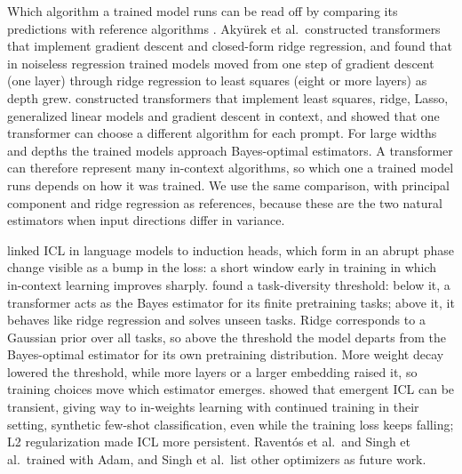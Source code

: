 \documentclass{article}
\begin{document}
Which algorithm a trained model runs can be read off by comparing its predictions with reference algorithms \citep{akyurek2023}. Akyürek et al.\ constructed transformers that implement gradient descent and closed-form ridge regression, and found that in noiseless regression trained models moved from one step of gradient descent (one layer) through ridge regression to least squares (eight or more layers) as depth grew. \citet{bai2023} constructed transformers that implement least squares, ridge, Lasso, generalized linear models and gradient descent in context, and showed that one transformer can choose a different algorithm for each prompt. For large widths and depths the trained models approach Bayes-optimal estimators. A transformer can therefore represent many in-context algorithms, so which one a trained model runs depends on how it was trained. We use the same comparison, with principal component and ridge regression as references, because these are the two natural estimators when input directions differ in variance.

\citet{olsson2022} linked ICL in language models to induction heads, which form in an abrupt phase change visible as a bump in the loss: a short window early in training in which in-context learning improves sharply. \citet{raventos2023} found a task-diversity threshold: below it, a transformer acts as the Bayes estimator for its finite pretraining tasks; above it, it behaves like ridge regression and solves unseen tasks. Ridge corresponds to a Gaussian prior over all tasks, so above the threshold the model departs from the Bayes-optimal estimator for its own pretraining distribution. More weight decay lowered the threshold, while more layers or a larger embedding raised it, so training choices move which estimator emerges. \citet{singh2023} showed that emergent ICL can be transient, giving way to in-weights learning with continued training in their setting, synthetic few-shot classification, even while the training loss keeps falling; L2 regularization made ICL more persistent. Raventós et al.\ and Singh et al.\ trained with Adam, and Singh et al.\ list other optimizers as future work.
\end{document}
